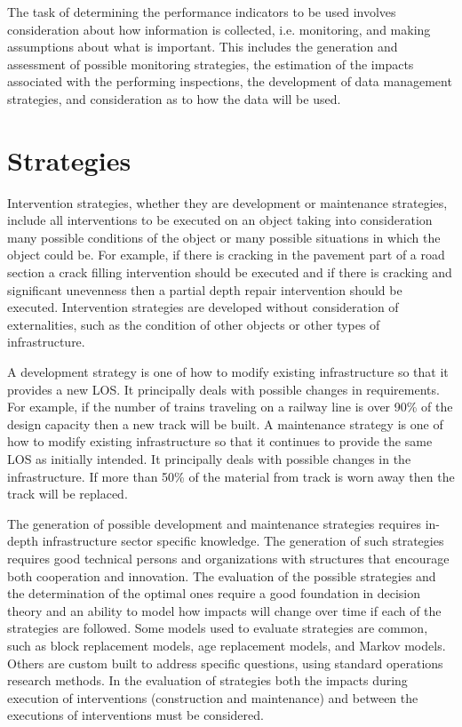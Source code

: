 The task of determining the performance indicators to be used involves consideration about how information is collected, i.e. monitoring, and making assumptions about what is important. This includes the generation and assessment of possible monitoring strategies, the estimation of the impacts associated with the performing inspections, the development of data management strategies, and consideration as to how the data will be used.

\section{Strategies}
Intervention strategies, whether they are development or maintenance strategies, include all interventions to be executed on an object taking into consideration many possible conditions of the object or many possible situations in which the object could be. For example, if there is cracking in the pavement part of a road section a crack filling intervention should be executed and if there is cracking and significant unevenness then a partial depth repair intervention should be executed. Intervention strategies are developed without consideration of externalities, such as the condition of other objects or other types of infrastructure.

A development strategy is one of how to modify existing infrastructure so that it provides a new LOS. It principally deals with possible changes in requirements. For example, if the number of trains traveling on a railway line is over 90\% of the design capacity then a new track will be built. A maintenance strategy is one of how to modify existing infrastructure so that it continues to provide the same LOS as initially intended. It principally deals with possible changes in the infrastructure. If more than 50\% of the material from track is worn away then the track will be replaced.

The generation of possible development and maintenance strategies requires in-depth infrastructure sector specific knowledge. The generation of such strategies requires good technical persons and organizations with structures that encourage both cooperation and innovation. The evaluation of the possible strategies and the determination of the optimal ones require a good foundation in decision theory and an ability to model how impacts will change over time if each of the strategies are followed. Some models used to evaluate strategies are common, such as block replacement models, age replacement models, and Markov models. Others are custom built to address specific questions, using standard operations research methods. In the evaluation of strategies both the impacts during execution of interventions (construction and maintenance) and between the executions of interventions must be considered.

